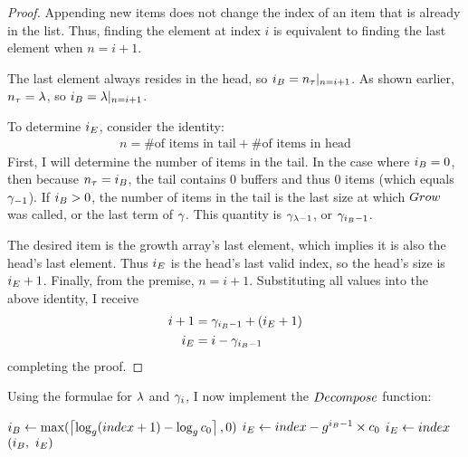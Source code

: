 \begin{proof}
	Appending new items does not change the index of an item that is already in the list. Thus, finding the element at index $i$ is equivalent to finding the last element when $n = i + 1$.
	
	The last element always resides in the head, so $i_B = n_\tau|_{n = i + 1}$. As shown earlier, $n_\tau = \lambda$, so $i_B = \lambda|_{n = i + 1}$.
	
	To determine $i_E$, consider the identity:
	\begin{align*}
	n = \text{\# of items in tail} + \text{\# of items in head}
	\end{align*}
	First, I will determine the number of items in the tail. In the case where $i_B = 0$, then because $n_\tau = i_B$, the tail contains $0$ buffers and thus $0$ items (which equals $\gamma_{-1}$). If $i_B > 0$, the number of items in the tail is the last size at which $Grow$ was called, or the last term of $\gamma$. This quantity is $\gamma_{\lambda - 1}$, or $\gamma_{i_B - 1}$.
	
	The desired item is the growth array's last element, which implies it is also the head's last element. Thus $i_E$ is the head's last valid index, so the head's size is $i_E + 1$. Finally, from the premise, $n = i + 1$. Substituting all values into the above identity, I receive
	\begin{align*}
	i + 1 &= \gamma_{i_B - 1} + (i_E + 1)\\
	i_E &= i - \gamma_{i_B - 1}
	\end{align*}
	completing the proof.
\end{proof}

Using the formulae for $\lambda$ and $\gamma_i$, I now implement the $\FuncDecompose$ function:

\begin{algorithm}[H]
	\begin{algorithmic}
		\Function{$\FuncDecompose$}{$\ParamIndex$}
			\State $i_B \gets \max(\left\lceil \log_{g} (index + 1) - \log_{g} c_0 \right\rceil, 0)$
				\State $i_E \gets index - g^{i_B - 1} \times c_0$
			\Else
				\State $i_E \gets index$
			\EndIf
			\State \Return $(\LclIndexBuffer,\ \LclIndexElement)$
		\EndFunction
	\end{algorithmic}
\end{algorithm}

